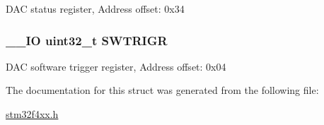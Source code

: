 D\-A\-C status register, Address offset\-: 0x34 \hypertarget{struct_d_a_c___type_def_a896bbb7153af0b67ad772360feaceeb4}{
\subsubsection[{S\-W\-T\-R\-I\-G\-R}]{\setlength{\rightskip}{0pt plus 5cm}\-\_\-\-\_\-\-I\-O uint32\-\_\-t S\-W\-T\-R\-I\-G\-R}}\label{struct_d_a_c___type_def_a896bbb7153af0b67ad772360feaceeb4}
D\-A\-C software trigger register, Address offset\-: 0x04 

The documentation for this struct was generated from the following file\-:\begin{DoxyCompactItemize}
\item 
\hyperlink{stm32f4xx_8h}{stm32f4xx.\-h}\end{DoxyCompactItemize}
